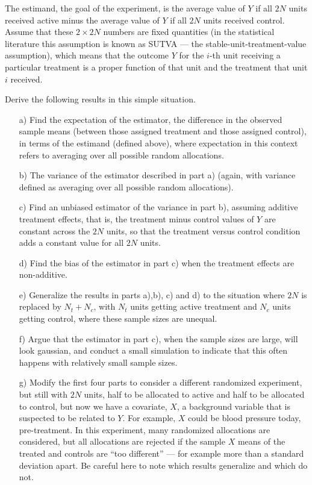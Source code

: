 \documentclass[10pt]{article}
\begin{document}
\begin{enumerate}
The estimand, the goal of the experiment, is the average value of $Y$ if all $2N$ units received active minus the average value of $Y$ if all $2N$ units received control.  Assume that these $2\times 2N$ numbers are fixed quantities (in the statistical literature this assumption is known as SUTVA — the stable-unit-treatment-value assumption), which means that the outcome $Y$ for the $i$-th unit receiving a particular treatment is a proper function of that unit and the treatment that unit $i$ received.

Derive the following results in this simple situation.

\begin{itemize}
\item[a)] Find the expectation of the estimator, the difference in the observed sample means (between those assigned treatment and those assigned control), in terms of the estimand (defined above), where expectation in this context refers to averaging over all possible random allocations.

\item[b)] The variance of the estimator described in part a) (again, with variance defined as averaging over all possible random allocations).

\item[c)] Find an unbiased estimator of the variance in part b), assuming additive treatment effects, that is, the treatment minus control values of $Y$ are constant across the $2N$ units, so that the treatment versus control condition adds a constant value for all $2N$ units.

\item[d)] Find the bias of the estimator in part c) when the treatment effects are non-additive.

\item[e)] Generalize the results in parts a),b), c) and d) to the situation where $2N$ is replaced by $N_t + N_c$, with $N_t$ units getting active treatment and $N_c$ units getting control, where these sample sizes are unequal.

\item[f)] Argue that the estimator in part c), when the sample sizes are large, will look gaussian, and conduct a small simulation to indicate that this often happens with relatively small sample sizes.

\item[g)] Modify the first four parts to consider a different randomized experiment, but still with $2N$ units, half to be allocated to active and half to be allocated to control, but now we have a covariate, $X$, a background variable that is suspected to be related to $Y$.  For example, $X$ could be blood pressure today, pre-treatment.  In this experiment, many randomized allocations are considered, but all allocations are rejected if the sample $X$ means of the treated and controls are “too different” — for example more than a standard deviation apart.  Be careful here to note which results generalize and which do not.


\end{itemize}
\end{enumerate}
\end{document}
